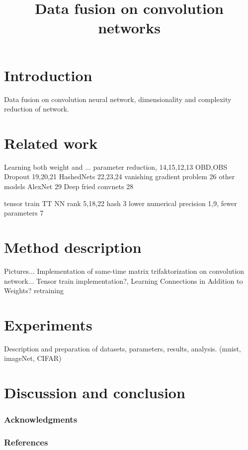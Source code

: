 \documentclass{article} %
\title{Data fusion on convolution networks}
\begin{document}
\maketitle

\begin{abstract}

\end{abstract}

\section{Introduction}
Data fusion on convolution neural network, dimensionality and complexity reduction of network.

\section{Related work}
Learning both weight and ... 
parameter reduction, 
14,15,12,13
OBD,OBS
Dropout 19,20,21
HashedNets 22,23,24
vanishing gradient problem 26
other models
AlexNet 29
Deep fried convnets 28

tensor train TT NN
rank 5,18,22
hash 3
lower numerical precision 1,9, fewer parameters 7


\section{Method description}
Pictures... Implementation of same-time matrix trifaktorization on convolution network... Tensor train implementation?, Learning Connections in Addition to Weights?
retraining

\section{Experiments}
Description and preparation of datasets, parameters, results, analysis. (mnist, imageNet, CIFAR)


\section{Discussion and conclusion}



\subsubsection*{Acknowledgments}



\subsubsection*{References}
\end{document}
